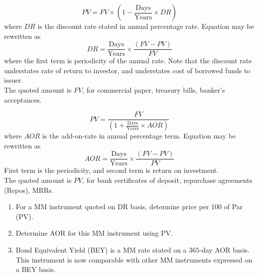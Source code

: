 \begin{method} 
\begin{equation}
PV = FV \times \left(1 - \frac{\text{Days}}{\text{Years}}\times DR \right) \nonumber
\end{equation}
where $DR$ is the discount rate stated in annual percentage rate. Equation may be rewritten as
\begin{equation}
DR = \frac{\text{Days}}{\text{Years}} \times \frac{(FV-PV)}{FV} \nonumber
\end{equation}
where the first term is periodicity of the annual rate. Note that the discount rate understates rate of return to investor, and understates cost of borrowed funds to issuer.\\
The quoted amount is $FV$, for commercial paper, treasury bills, banker's acceptances.
\end{method}

\begin{method} 
\begin{equation}
PV = \frac{FV}{\left( 1 +  \frac{\text{Days}}{\text{Years}} \times AOR \right)} \nonumber
\end{equation}
where $AOR$ is the add-on-rate in annual percentage term. Equation may be rewritten as
\begin{equation}
AOR = \frac{\text{Days}}{\text{Years}} \times \frac{(FV-PV)}{PV} \nonumber 
\end{equation}
First term is the periodicity, and second term is return on investment.\\
The quoted amount is $PV$, for bank certificates of deposit, repurchase agreements (Repos), MRRs.
\end{method}

\begin{method} 
\begin{enumerate}[label=\roman*.]
\setlength{\itemsep}{0pt}
\item For a MM instrument quoted on DR basis, determine price per 100 of Par (PV).
\item Determine AOR for this MM instrument using PV.
\item Bond Equivalent Yield (BEY) is a MM rate stated on a $365$-day AOR basis. This instrument is now comparable with other MM instruments expressed on a BEY basis.
\end{enumerate}
\end{method}


